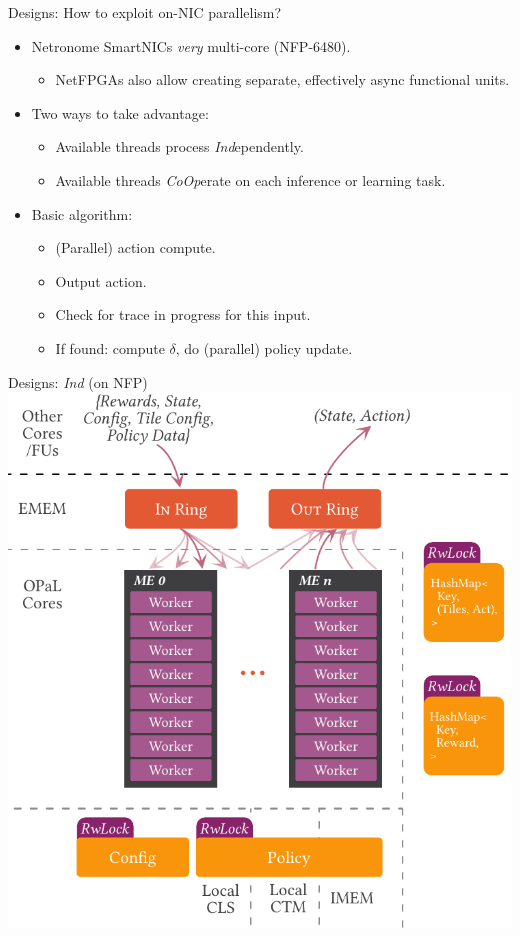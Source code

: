 \documentclass[aspectratio=169,xcolor={dvipsnames}
,handout
]{beamer}
\newcommand{\Coopfw}{\emph{CoOp}}
\newcommand{\Indfw}{\emph{Ind}}
\begin{document}
\begin{frame}{Designs: How to exploit on-NIC parallelism?}
	\begin{itemize}[<+->]
		\item Netronome SmartNICs \emph{very} multi-core (NFP-6480).
		\begin{itemize}[<+->]
			\item NetFPGAs also allow creating separate, effectively async functional units.
		\end{itemize}
		\item Two ways to take advantage:
		\begin{itemize}[<+->]
			\item Available threads process \Indfw{}ependently.
			\item Available threads \Coopfw{}erate on each inference or learning task.
		\end{itemize}
		\item Basic algorithm:
		\begin{itemize}[<+->]
			\item (Parallel) action compute.
			\item Output action.
			\item Check for trace in progress for this input.
			\item If found: compute $\delta$, do (parallel) policy update.
		\end{itemize}
	\end{itemize}
\end{frame}

\begin{frame}{Designs: \emph{Ind} (on NFP)}
	\centering
	\includegraphics[width=0.52\linewidth]{../paper/figures/ind}
\end{frame}
\end{document}
